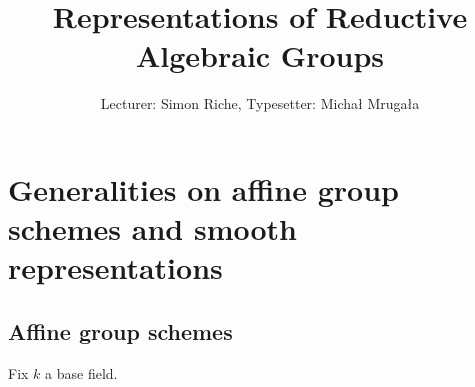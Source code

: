 

\usepackage{stmaryrd}
\usepackage[nameinlink]{cleveref}

\def\i{\operatorname{inv}}
\def\Gm{\mathbb{G}_m}
\def\Ga{\mathbb{G}_a}
\def\Diag{\operatorname{Diag}}
\def\Rep{\operatorname{Rep}}
\def\Repf{\operatorname{Rep}^{\text{fd}}}
\def\Res{\operatorname{Res}}
\def\Ind{\operatorname{Ind}}

\title{Representations of Reductive Algebraic Groups}
\author{Lecturer: Simon Riche, Typesetter: Micha{\l} Mruga{\l}a}

\maketitle
\tableofcontents

\newpage

\section{Generalities on affine group schemes and smooth representations}
\subsection{Affine group schemes}
Fix $k$ a base field.

